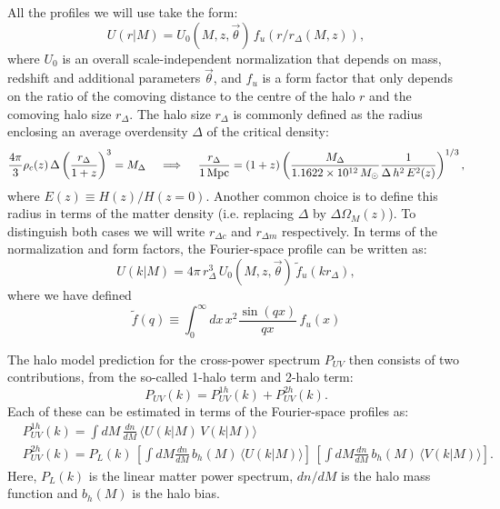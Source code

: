 \documentclass{article}
\begin{document}
All the profiles we will use take the form:
\begin{equation}
  U(r|M)=U_0(M,z,\vec{\theta})\,f_u(r/r_\Delta(M,z)),
\end{equation}
where $U_0$ is an overall scale-independent normalization that depends on mass, redshift and additional parameters $\vec{\theta}$, and $f_u$ is a form factor that only depends on the ratio of the comoving distance to the centre of the halo $r$ and the comoving halo size $r_\Delta$. The halo size $r_\Delta$ is commonly defined as the radius enclosing an average overdensity $\Delta$ of the critical density:
\begin{equation}
  \frac{4\pi}{3}\rho_c(z)\,\Delta\left(\frac{r_\Delta}{1+z}\right)^3=M_\Delta
  \hspace{12pt}\Longrightarrow\hspace{12pt}
  \frac{r_\Delta}{1\,{\rm Mpc}}=(1+z)\left(\frac{M_\Delta}{1.1622\times10^{12}\,M_\odot}\frac{1}{\Delta\,h^2\,E^2(z)}\right)^{1/3},
\end{equation}
where $E(z)\equiv H(z)/H(z=0)$. Another common choice is to define this radius in terms of the matter density (i.e. replacing $\Delta$ by $\Delta\Omega_M(z)$). To distinguish both cases we will write $r_{\Delta c}$ and $r_{\Delta m}$ respectively. In terms of the normalization and form factors, the Fourier-space profile can be written as:
\begin{equation}
  U(k|M)=4\pi\,r_\Delta^3\,U_0(M,z,\vec{\theta})\,\tilde{f}_u(kr_\Delta),
\end{equation}
where we have defined
\begin{equation}
  \tilde{f}(q)\equiv\int_0^\infty dx\,x^2\frac{\sin(q x)}{q x}\,f_u(x)
\end{equation}

The halo model prediction for the cross-power spectrum $P_{UV}$ then consists of two contributions, from the so-called 1-halo term and 2-halo term:
\begin{equation}
  P_{UV}(k)=P^{1h}_{UV}(k)+P^{2h}_{UV}(k).
\end{equation}
Each of these can be estimated in terms of the Fourier-space profiles as:
\begin{align}
  &P^{1h}_{UV}(k)=\int dM\,\frac{dn}{dM}\,\langle U(k|M)\,V(k|M)\rangle\\
  &P^{2h}_{UV}(k)=P_L(k)\,\left[\int dM\frac{dn}{dM}\,b_h(M)\,\langle U(k|M)\rangle\right]\,\left[\int dM\frac{dn}{dM}\,b_h(M)\,\langle V(k|M)\rangle\right].
\end{align}
Here, $P_L(k)$ is the linear matter power spectrum, $dn/dM$ is the halo mass function and $b_h(M)$ is the halo bias.
\end{document}
